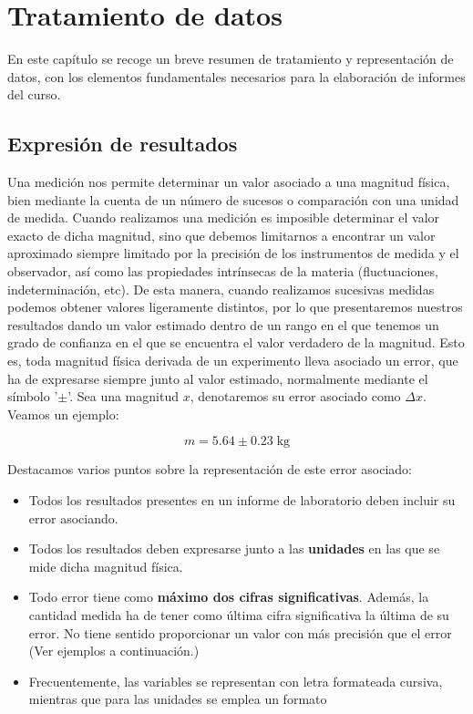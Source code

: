 \documentclass{book}
\begin{document}
\chapter*{Tratamiento de datos}

En este capítulo se recoge un breve resumen de tratamiento y representación de datos,
con los elementos fundamentales necesarios para la elaboración de informes del curso.

\section{Expresión de resultados}

Una medición nos permite determinar un valor asociado a una magnitud física, bien mediante
la cuenta de un número de sucesos o comparación con una unidad de medida. Cuando realizamos
una medición es imposible determinar el valor exacto de dicha magnitud, sino que debemos
limitarnos a encontrar un valor aproximado siempre limitado por la precisión de los instrumentos
de medida y el observador, así como las propiedades intrínsecas de la materia (fluctuaciones,
indeterminación, etc). De esta manera, cuando realizamos sucesivas medidas podemos obtener valores
ligeramente distintos, por lo que presentaremos nuestros resultados dando un valor estimado dentro
de un rango en el que tenemos un grado de confianza en el que se encuentra el valor verdadero de
la magnitud. Esto es, toda magnitud física derivada de un experimento lleva asociado un error, 
que ha de expresarse siempre junto al valor estimado, normalmente mediante el símbolo '$\pm$'.
Sea una magnitud $x$, denotaremos su error asociado como $\Delta x$. Veamos un ejemplo:


\begin{equation}
    m = 5.64 \pm 0.23 \; \mathrm{kg}
\end{equation}

Destacamos varios puntos sobre la representación de este error asociado:

\begin{itemize}
  \item Todos los resultados presentes en un informe de laboratorio deben incluir su error 
  asociando.
  \item Todos los resultados deben expresarse junto a las \textbf{unidades} en las que se mide dicha 
  magnitud física.
  \item Todo error tiene como \textbf{máximo dos cifras significativas}. Además, la cantidad medida
  ha de tener como última cifra significativa la última de su error. No tiene sentido proporcionar
  un valor con más precisión que el error (Ver ejemplos a continuación.)
  \item Frecuentemente, las variables se representan con letra formateada cursiva, mientras 
  que para las unidades se emplea un formato
\end{itemize}
\end{document}
